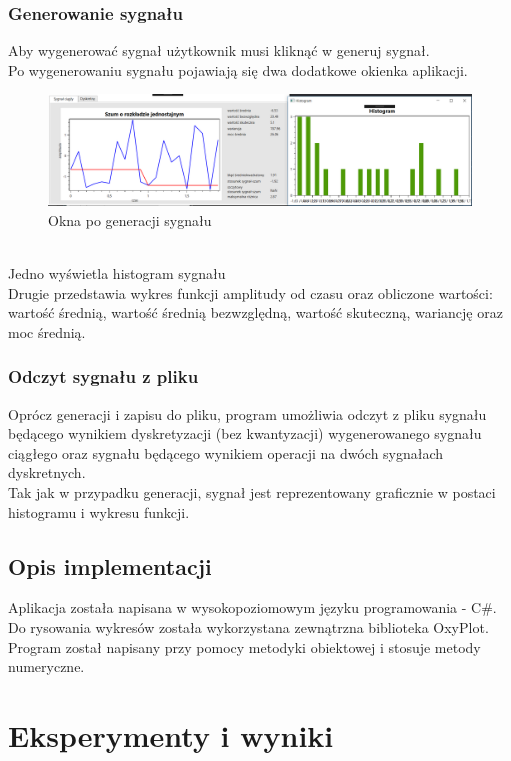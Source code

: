 \documentclass[12pt]{article}
\begin{document}
\subsubsection{Generowanie sygnału}
Aby wygenerować sygnał użytkownik musi kliknąć w generuj sygnał.
\\Po wygenerowaniu sygnału pojawiają się dwa dodatkowe okienka aplikacji.
\begin{figure}[h!]
 \centering
 \includegraphics[width=15.3cm]{okienka.PNG}
 \vspace{-0.3cm}
 \caption{Okna po generacji sygnału}
 \label{Widok_aplikacjis}
\end{figure}
\\Jedno wyświetla histogram sygnału
\\Drugie przedstawia wykres funkcji amplitudy od czasu oraz obliczone wartości: wartość średnią, wartość średnią bezwzględną, wartość skuteczną, wariancję oraz moc średnią.

\subsubsection{Odczyt sygnału z pliku}
Oprócz generacji i zapisu do pliku, program umożliwia odczyt z pliku sygnału będącego wynikiem dyskretyzacji (bez kwantyzacji) wygenerowanego
sygnału ciągłego oraz sygnału będącego wynikiem operacji na dwóch sygnałach dyskretnych.
\\Tak jak w przypadku generacji, sygnał jest  reprezentowany graficznie w postaci histogramu i wykresu funkcji.

\subsection{Opis implementacji}
Aplikacja została napisana w wysokopoziomowym języku programowania - C\#. Do rysowania wykresów została wykorzystana zewnątrzna biblioteka OxyPlot. Program został napisany przy pomocy metodyki obiektowej i stosuje metody numeryczne.

\section{Eksperymenty i wyniki}
\end{document}
